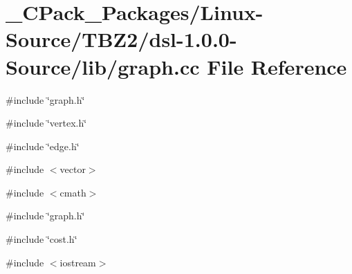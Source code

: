 \section{\_\-CPack\_\-Packages/Linux-\/Source/TBZ2/dsl-\/1.0.0-\/Source/lib/graph.cc File Reference}
\label{__CPack__Packages_2Linux-Source_2TBZ2_2dsl-1_80_80-Source_2lib_2graph_8cc}
{\ttfamily \#include \char`\"{}graph.h\char`\"{}}\par
{\ttfamily \#include \char`\"{}vertex.h\char`\"{}}\par
{\ttfamily \#include \char`\"{}edge.h\char`\"{}}\par
{\ttfamily \#include $<$vector$>$}\par
{\ttfamily \#include $<$cmath$>$}\par
{\ttfamily \#include \char`\"{}graph.h\char`\"{}}\par
{\ttfamily \#include \char`\"{}cost.h\char`\"{}}\par
{\ttfamily \#include $<$iostream$>$}\par
